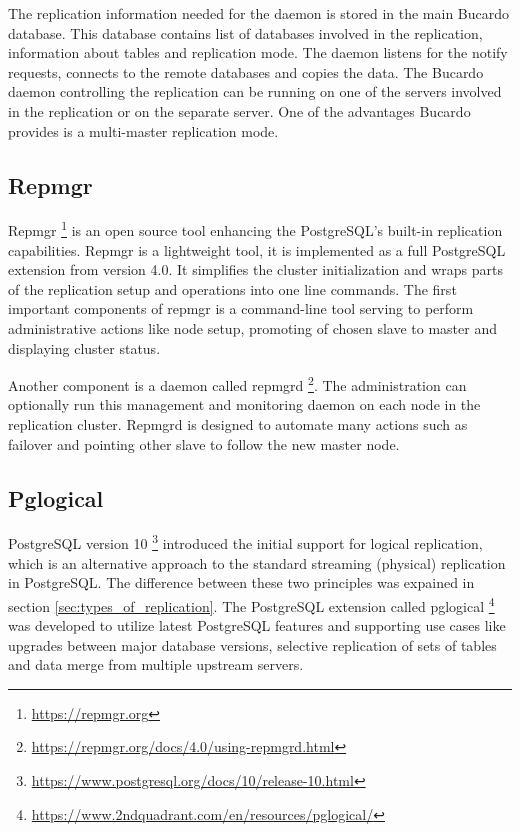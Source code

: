 \documentclass[
  digital, %
  twoside, %
  table,   %
  lof,     %
  lot,     %
]{fithesis3}
\begin{document}
The replication information needed for the daemon is stored in the main Bucardo database. This database contains list of databases involved in the replication, information about tables and replication mode. The daemon listens for the notify requests, connects to the remote databases and copies the data. The Bucardo daemon controlling the replication can be running on one of the servers involved in the replication or on the separate server. One of the advantages Bucardo provides is a multi-master replication mode.

\subsection{Repmgr} \label{sec:repmgr}
Repmgr \footnote{\url{https://repmgr.org}} is an open source tool enhancing the PostgreSQL's built-in replication capabilities. Repmgr is a lightweight tool, it is implemented as a full PostgreSQL extension from version 4.0. It simplifies the cluster initialization and wraps parts of the replication setup and operations into one line commands.
The first important components of repmgr is a command-line tool serving to perform administrative actions like node setup, promoting of chosen slave to master and displaying cluster status.

Another component is a daemon called repmgrd \footnote{\url{https://repmgr.org/docs/4.0/using-repmgrd.html}}. The administration can optionally run this management and monitoring daemon on each node in the replication cluster. Repmgrd is designed to automate many actions such as failover and pointing other slave to follow the new master node.

\subsection{Pglogical}
PostgreSQL version 10 \footnote{\url{https://www.postgresql.org/docs/10/release-10.html}} introduced the initial support for logical replication, which is an alternative approach to the standard streaming (physical) replication in PostgreSQL. The difference between these two principles was expained in section \ref{sec:types_of_replication}. The PostgreSQL extension called pglogical \footnote{\url{https://www.2ndquadrant.com/en/resources/pglogical/}} was developed to utilize latest PostgreSQL features and supporting use cases like upgrades between major database versions, selective replication of sets of tables and data merge from multiple upstream servers.
\end{document}

